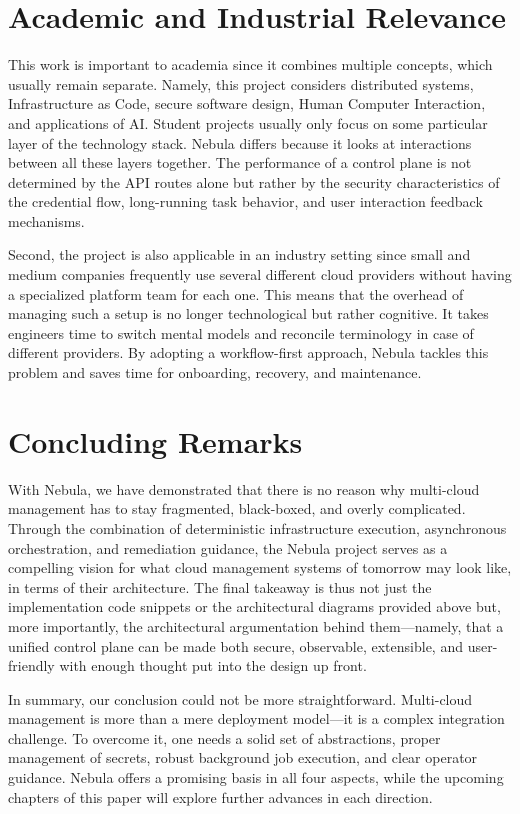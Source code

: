 \section{Academic and Industrial Relevance}
This work is important to academia since it combines multiple concepts, which usually remain separate. Namely, this project considers distributed systems, Infrastructure as Code, secure software design, Human Computer 
Interaction, and applications of AI. Student projects usually only focus on some particular layer of the technology stack. Nebula differs because it looks at interactions between all these layers together. The performance of a control plane is not determined by the API routes alone but rather by the security characteristics of the credential flow, long-running task behavior, and user interaction feedback mechanisms.


Second, the project is also applicable in an industry setting since small and medium companies frequently use several different cloud providers without having a specialized platform team for each one. This means that the overhead of managing such a setup is no longer technological but rather cognitive. It takes engineers time to switch mental models and reconcile terminology in case of different providers. By adopting a workflow-first approach, Nebula tackles this problem and saves time for onboarding, recovery, and maintenance.


\section{Concluding Remarks}
With Nebula, we have demonstrated that there is no reason why multi-cloud management has to stay fragmented, black-boxed, and overly complicated. Through the combination of deterministic infrastructure execution, asynchronous orchestration, and remediation guidance, the Nebula project serves as a compelling vision for what cloud management systems of tomorrow may look like, in terms of their architecture. The final takeaway is thus not just the implementation code snippets or the architectural diagrams provided above but, more importantly, the architectural argumentation behind them—namely, that a unified control plane can be made both secure, observable, extensible, and user-friendly with enough thought put into the design up front.


In summary, our conclusion could not be more straightforward. Multi-cloud management is more than a mere deployment model—it is a complex integration challenge. To overcome it, one needs a solid set of abstractions, proper management of secrets, robust background job execution, and clear operator guidance. Nebula offers a promising basis in all four aspects, while the upcoming chapters of this paper will explore further advances in each direction.


\newpage

